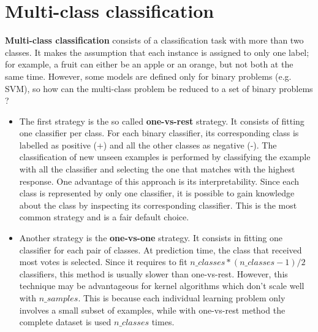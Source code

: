 \section{Multi-class classification}
\textbf{Multi-class classification} consists of a classification task with more than two classes. It makes the assumption that each instance is assigned to only one label; for example, a fruit can either be an apple or an orange, but not both at the same time.\newline\newline
However, some models are defined only for binary problems (e.g. SVM), so how can the multi-class problem be reduced to a set of binary problems ?
\begin{itemize}
    \item The first strategy is the so called \textbf{one-vs-rest} strategy. It consists of fitting one classifier per class. For each binary classifier, its corresponding class is labelled as positive (+) and all the other classes as negative (-).\newline\newline
    The classification of new unseen examples is performed by classifying the example with all the classifier and selecting the one that matches with the highest response.\newline\newline
    One advantage of this approach is its interpretability. Since each class is represented  by only one classifier, it is possible to gain knowledge about the class by inspecting its corresponding classifier. This is the most common strategy and is a fair default choice.

    \item Another strategy is the \textbf{one-vs-one} strategy. It consists in fitting one classifier for each pair of classes. At prediction time, the class that received most votes is selected.\newline\newline
    Since it requires to fit $n\_classes * (n\_classes - 1 ) / 2$ classifiers, this method is usually slower than one-vs-rest. However, this technique may be advantageous for kernel algorithms which don't scale well with $n\_samples$. This is because each individual learning problem only involves a small subset of examples, while with one-vs-rest method the complete dataset is used $n\_classes$ times.
\end{itemize}

